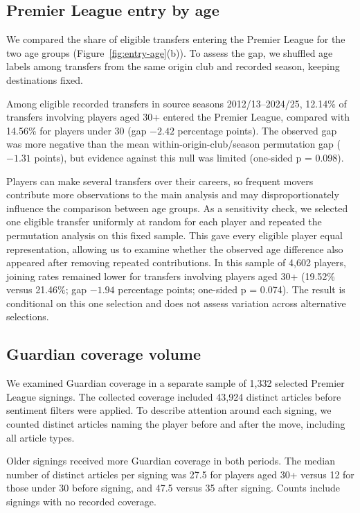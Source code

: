 \subsection*{Premier League entry by age}

We compared the share of eligible transfers entering the Premier League for the two age groups (Figure~\ref{fig:entry-age}(b)). To assess the gap, we shuffled age labels among transfers from the same origin club and recorded season, keeping destinations fixed.

Among eligible recorded transfers in source seasons 2012/13--2024/25, 12.14\% of transfers involving players aged 30+ entered the Premier League, compared with 14.56\% for players under 30 (gap $-2.42$ percentage points). The observed gap was more negative than the mean within-origin-club/season permutation gap ($-1.31$ points), but evidence against this null was limited (one-sided p = 0.098).

Players can make several transfers over their careers, so frequent movers contribute more observations to the main analysis and may disproportionately influence the comparison between age groups. As a sensitivity check, we selected one eligible transfer uniformly at random for each player and repeated the permutation analysis on this fixed sample. This gave every eligible player equal representation, allowing us to examine whether the observed age difference also appeared after removing repeated contributions. In this sample of 4,602 players, joining rates remained lower for transfers involving players aged 30+ (19.52\% versus 21.46\%; gap $-1.94$ percentage points; one-sided p = 0.074). The result is conditional on this one selection and does not assess variation across alternative selections.

\subsection*{Guardian coverage volume}

We examined Guardian coverage in a separate sample of 1,332 selected Premier League signings. The collected coverage included 43,924 distinct articles before sentiment filters were applied. To describe attention around each signing, we counted distinct articles naming the player before and after the move, including all article types.

Older signings received more Guardian coverage in both periods. The median number of distinct articles per signing was 27.5 for players aged 30+ versus 12 for those under 30 before signing, and 47.5 versus 35 after signing. Counts include signings with no recorded coverage.


